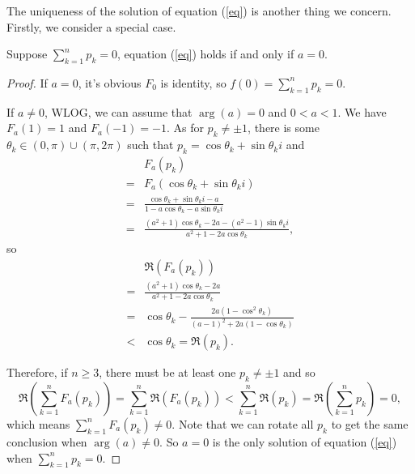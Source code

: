 \documentclass[review,onefignum,onetabnum]{siamonline190516}
\begin{document}
    The uniqueness of the solution of equation (\ref{eq}) is another thing we concern. Firstly, we consider a special case.
    
    \begin{theorem}\label{uniqueness when 0}
        Suppose $\sum_{k=1}^n p_k = 0$, equation (\ref{eq}) holds if and only if $a = 0$.
    \end{theorem}

    \begin{proof}
        If $a = 0$, it's obvious $F_0$ is identity, so $f(0) = \sum_{k=1}^n p_k = 0$.
        
        If $a \neq 0$, WLOG, we can assume that $\arg(a) = 0$ and $0 < a < 1$. We have $F_a(1) = 1$ and $F_a(-1) = -1$. As for $p_k \neq \pm 1$, there is some $\theta_k \in (0, \pi) \cup (\pi, 2\pi)$ such that $p_k = \cos \theta_k + \sin \theta_k i$ and
        \begin{align*}
            &F_a(p_k) \\
            = &F_a(\cos \theta_k + \sin \theta_k i) \\
            = &\frac{\cos \theta_k + \sin \theta_k i - a}{1 - a \cos \theta_k - a \sin \theta_k i} \\
            = &\frac{(a^2 + 1) \cos \theta_k -2a - (a^2 - 1) \sin \theta_k i}{a^2 + 1 - 2a \cos \theta_k},
        \end{align*}
        so
        \begin{align*}
            &\Re(F_a(p_k)) \\
            = &\frac{(a^2 + 1) \cos \theta_k -2a}{a^2 + 1 - 2a \cos \theta_k} \\
            = &\cos \theta_k - \frac{2a(1-\cos^2 \theta_k)}{(a-1)^2 + 2a(1-\cos \theta_k)} \\
            < &\cos \theta_k = \Re(p_k).
        \end{align*}

        Therefore, if $n \ge 3$, there must be at least one $p_k \neq \pm 1$ and so
        \begin{equation*}
            \Re(\sum_{k=1}^n F_a(p_k)) = \sum_{k=1}^n \Re(F_a(p_k)) < \sum_{k=1}^n \Re(p_k) = \Re(\sum_{k=1}^n p_k)  = 0,
        \end{equation*}
        which means $\sum_{k=1}^n F_a(p_k) \neq 0$. Note that we can rotate all $p_k$ to get the same conclusion when $\arg(a) \neq 0$. So $a=0$ is the only solution of equation (\ref{eq}) when $\sum_{k=1}^n p_k = 0$.
    \end{proof}
\end{document}
